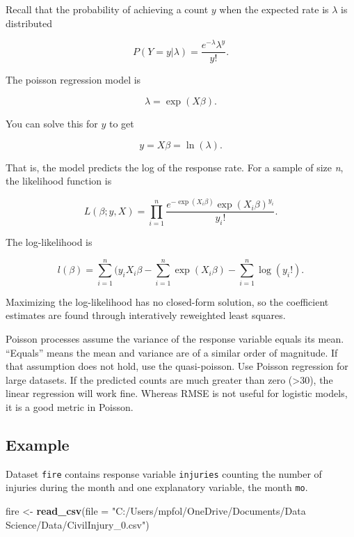 \documentclass[
]{book}
\newenvironment{Shaded}{\begin{snugshade}}{\end{snugshade}}
\newcommand{\DataTypeTok}[1]{\textcolor[rgb]{0.13,0.29,0.53}{#1}}
\newcommand{\KeywordTok}[1]{\textcolor[rgb]{0.13,0.29,0.53}{\textbf{#1}}}
\newcommand{\NormalTok}[1]{#1}
\newcommand{\StringTok}[1]{\textcolor[rgb]{0.31,0.60,0.02}{#1}}
\begin{document}
Recall that the probability of achieving a count \(y\) when the expected rate is \(\lambda\) is distributed

\[P(Y = y|\lambda) = \frac{e^{-\lambda} \lambda^y}{y!}.\]

The poisson regression model is

\[\lambda = \exp(X \beta).\]

You can solve this for \(y\) to get

\[y = X\beta = \ln(\lambda).\]

That is, the model predicts the log of the response rate. For a sample of size \emph{n}, the likelihood function is

\[L(\beta; y, X) = \prod_{i=1}^n \frac{e^{-\exp({X_i\beta})}\exp({X_i\beta})^{y_i}}{y_i!}.\]

The log-likelihood is

\[l(\beta) = \sum_{i=1}^n (y_i X_i \beta - \sum_{i=1}^n\exp(X_i\beta) - \sum_{i=1}^n\log(y_i!).\]

Maximizing the log-likelihood has no closed-form solution, so the coefficient estimates are found through interatively reweighted least squares.

Poisson processes assume the variance of the response variable equals its mean. ``Equals'' means the mean and variance are of a similar order of magnitude. If that assumption does not hold, use the quasi-poisson. Use Poisson regression for large datasets. If the predicted counts are much greater than zero (\textgreater30), the linear regression will work fine. Whereas RMSE is not useful for logistic models, it is a good metric in Poisson.

\hypertarget{example-7}{%
\subsection*{Example}\label{example-7}}

Dataset \texttt{fire} contains response variable \texttt{injuries} counting the number of injuries during the month and one explanatory variable, the month \texttt{mo}.

\begin{Shaded}
\begin{Highlighting}[]
\NormalTok{fire <-}\StringTok{ }\KeywordTok{read_csv}\NormalTok{(}\DataTypeTok{file =} \StringTok{"C:/Users/mpfol/OneDrive/Documents/Data Science/Data/CivilInjury_0.csv"}\NormalTok{)}
\end{Highlighting}
\end{Shaded}
\end{document}
